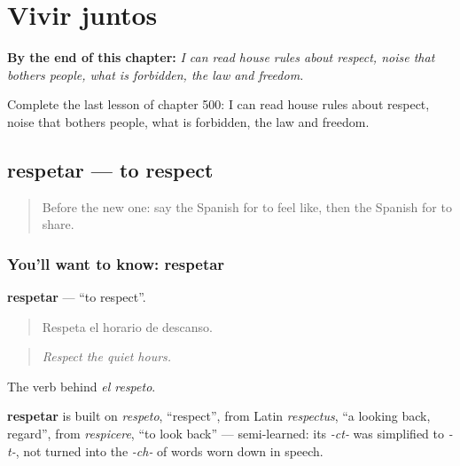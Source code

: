 
\chapter{Vivir juntos}
\label{ch:es-vivir-juntos}

\begin{chapteropening}
\textbf{By the end of this chapter:} \emph{I can read house rules about respect, noise that bothers people, what is forbidden, the law and freedom.}

Complete the last lesson of chapter 500: I can read house rules about respect, noise that bothers people, what is forbidden, the law and freedom.
\end{chapteropening}

\section[respetar]{respetar — to respect}

\label{lesson:ES-C500-respetar}



\begin{quote}
Before the new one: say the Spanish for to feel like, then the Spanish for to share.
\end{quote}

\subsection*{You'll want to know: respetar}
\textbf{respetar} — \textquotedblleft{}to respect\textquotedblright{}.

\begin{quote}
Respeta el horario de descanso.
\end{quote}

\begin{quote}
\emph{Respect the quiet hours.}
\end{quote}

The verb behind \emph{el respeto}.

\begin{cousinweb}
\textbf{respetar} is built on \emph{respeto}, \textquotedblleft{}respect\textquotedblright{}, from Latin \emph{respectus}, \textquotedblleft{}a looking back, regard\textquotedblright{}, from \emph{respicere}, \textquotedblleft{}to look back\textquotedblright{} — semi-learned: its \emph{-ct-} was simplified to \emph{-t-}, not turned into the \emph{-ch-} of words worn down in speech.
\end{cousinweb}

